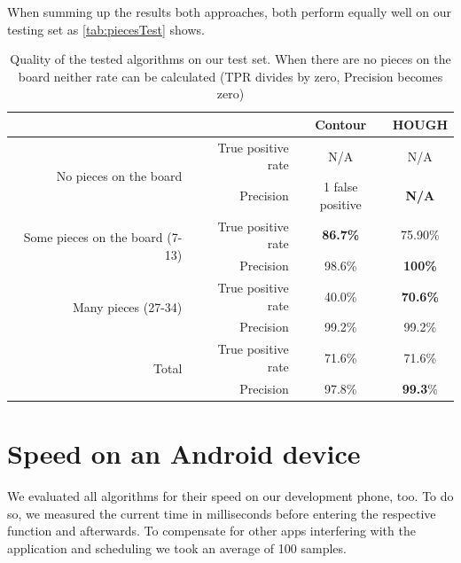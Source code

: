 	When summing up the results both approaches, both perform equally well on our testing set as \autoref{tab:piecesTest} shows.
	\begin{table}[bh]
		\begin{tabular}{|r|r||c|c|}
			\cline{3-4}
		    \multicolumn{2}{c|}{}											 		& Contour 	& HOUGH\\
			\cline{3-4}
			\hline
			\multirow{2}{*}{No pieces on the board}   		& True positive rate 	& N/A 		& N/A  \\
															& Precision			 	& 1 false positive 		& \bf{N/A} \\
			\hline
			\multirow{2}{*}{Some pieces on the board (7-13)}& True positive rate 	& \bf{86.7\%} 	& 75.90\% \\
															& Precision 			& 98.6\% 		& \bf{100\%} \\
			\hline
			\multirow{2}{*}{Many pieces (27-34)} 			& True positive rate 	& 40.0\% 		& \bf{70.6\%} \\
															& Precision			 	& 99.2\% 		& 99.2\% \\
			\hline
			\hline
			\multirow{2}{*}{Total}				 			& True positive rate 	& 71.6\% 		& 71.6\% \\
															& Precision			 	& 97.8\% 		& \textbf{99.3}\% \\
			\hline
		\end{tabular}
		\caption{Quality of the tested algorithms on our test set. When there are no pieces on the board neither rate can be calculated (TPR divides by zero, Precision becomes zero)}
		\label{tab:piecesTest}
	\end{table}





	\section{Speed on an Android device}
	\label{evaluation-speed}
	We evaluated all algorithms for their speed on our development phone, too. To do so, we measured the current time in milliseconds before entering the respective function and afterwards. To compensate for other apps interfering with the application and scheduling we took an average of 100 samples. 

